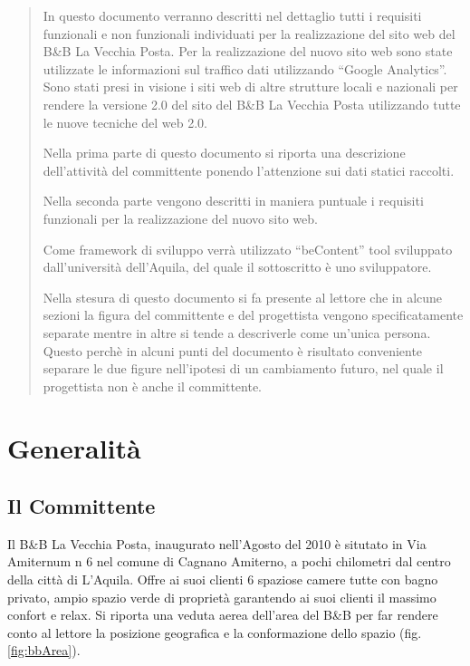 \documentclass[a4paper,12pt,hidelinks]{report}
\begin{document}
\begin{abstract}
  In questo documento verranno descritti nel dettaglio tutti i requisiti funzionali e non funzionali individuati per la realizzazione del sito web del B\&B La Vecchia Posta.
  Per la realizzazione del nuovo sito web sono state utilizzate le informazioni sul traffico dati utilizzando ``Google Analytics''. Sono stati presi in visione i siti web di altre strutture
  locali e nazionali per rendere la versione 2.0 del sito del B\&B La Vecchia Posta utilizzando tutte le nuove tecniche del web 2.0.
  \par Nella prima parte di questo documento si riporta una descrizione dell'attività del committente ponendo l'attenzione sui dati statici raccolti.
  \par Nella seconda parte vengono descritti in maniera puntuale i requisiti funzionali per la realizzazione del nuovo sito web.
  \par Come framework di sviluppo verrà utilizzato ``beContent'' tool sviluppato dall'università dell'Aquila, del quale il sottoscritto è uno sviluppatore.
  \par Nella stesura di questo documento si fa presente al lettore che in alcune sezioni la figura del committente e del progettista vengono specificatamente separate mentre in altre si tende a 
  descriverle come un'unica persona. Questo perchè in alcuni punti del documento è risultato conveniente separare le due figure nell'ipotesi di un cambiamento futuro, nel quale il progettista 
  non è anche il committente.
\end{abstract}

\chapter{Generalità}

\section{Il Committente}
  Il B\&B La Vecchia Posta, inaugurato nell'Agosto del 2010 è situtato in Via Amiternum n 6 nel comune di Cagnano Amiterno, a pochi chilometri dal centro della città di L'Aquila.
  Offre ai suoi clienti 6 spaziose camere tutte con bagno privato, ampio spazio verde di proprietà garantendo ai suoi clienti il massimo confort e relax. 
  Si riporta una veduta aerea dell'area del B\&B per far rendere conto al lettore la posizione geografica e la conformazione dello spazio (fig.\ref{fig:bbArea}). 
\end{document}
